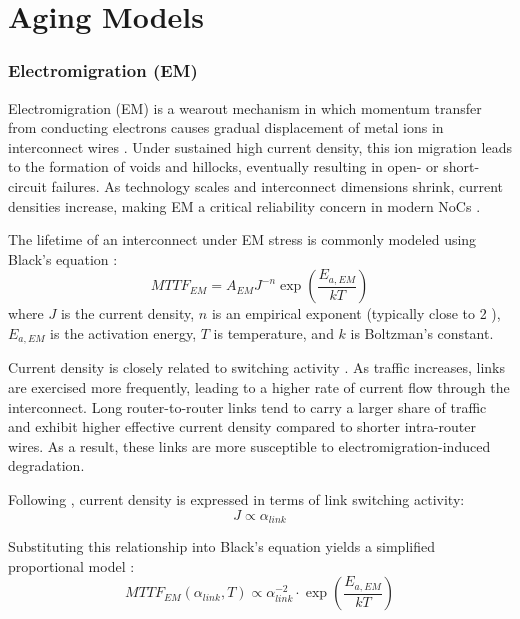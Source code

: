 \section{Aging Models}

\subsubsection{Electromigration (EM)}

Electromigration (EM) is a wearout mechanism in which momentum transfer from conducting electrons causes gradual displacement of metal ions in interconnect wires \cite{Black1969}. Under sustained high current density, this ion migration leads to the formation of voids and hillocks, eventually resulting in open- or short-circuit failures. As technology scales and interconnect dimensions shrink, current densities increase, making EM a critical reliability concern in modern NoCs \cite{Clotho2015}.

The lifetime of an interconnect under EM stress is commonly modeled using Black's equation \cite{Black1969}:
\begin{equation}
MTTF_{EM} = A_{EM} J^{-n} \exp\left(\frac{E_{a,EM}}{kT}\right)
\end{equation}
where $J$ is the current density, $n$ is an empirical exponent (typically close to 2 \cite{Clotho2015}), $E_{a,EM}$ is the activation energy, $T$ is temperature, and $k$ is Boltzman's constant.

Current density is closely related to switching activity \cite{Black1969}. As traffic increases, links are exercised more frequently, leading to a higher rate of current flow through the interconnect. Long router-to-router links tend to carry a larger share of traffic and exhibit higher effective current density compared to shorter intra-router wires. As a result, these links are more susceptible to electromigration-induced degradation.

Following \cite{Clotho2015}, current density is expressed in terms of link switching activity:
\begin{equation}
J \propto \alpha_{link}
\end{equation}

Substituting this relationship into Black's equation yields a simplified proportional model \cite{Clotho2015}:
\begin{equation}
MTTF_{EM}(\alpha_{link}, T) \propto \alpha_{link}^{-2} \cdot \exp\left(\frac{E_{a,EM}}{kT}\right)
\end{equation}

